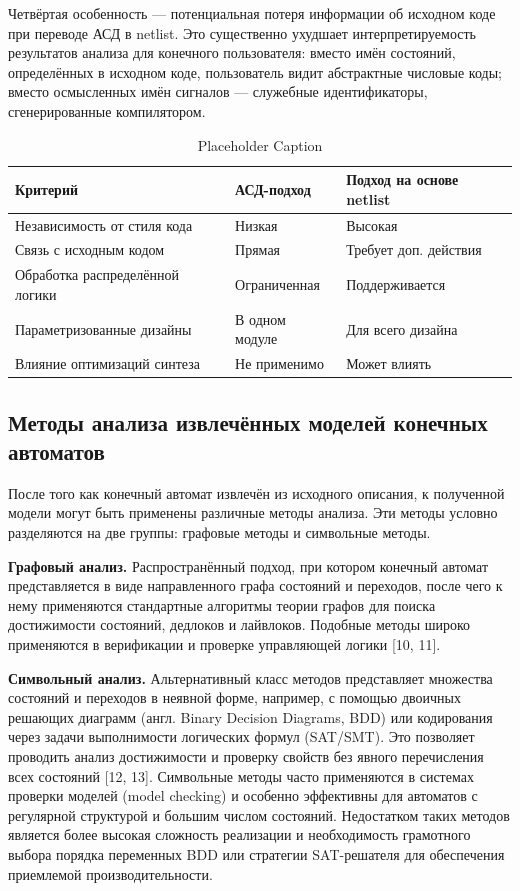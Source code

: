 Четвёртая особенность --- потенциальная потеря информации об исходном коде при переводе АСД
в netlist. Это существенно ухудшает интерпретируемость результатов анализа для конечного
пользователя: вместо имён состояний, определённых в исходном коде, пользователь видит абстрактные
числовые коды; вместо осмысленных имён сигналов — служебные идентификаторы,
сгенерированные компилятором.

\begin{table}[h]
    \centering
    \caption{Placeholder Caption}
    \label{tab:placeholder_label}
    \begin{tabular}{|l|l|l|}
        \hline
        \textbf{Критерий} & \textbf{АСД-подход} &
        \textbf{Подход на основе netlist} \\
        \hline
        Независимость от стиля кода & Низкая &
        Высокая \\
        \hline
        Связь с исходным кодом & Прямая & Требует доп. действия \\
        \hline
        Обработка распределённой логики & Ограниченная & Поддерживается \\
        \hline
        Параметризованные дизайны & В одном модуле & Для всего дизайна \\
        \hline
        Влияние оптимизаций синтеза & Не применимо & Может влиять \\
        \hline
    \end{tabular}
\end{table}

\subsection{Методы анализа извлечённых моделей конечных автоматов}

После того как конечный автомат извлечён из исходного описания, к полученной модели могут быть
применены различные методы анализа. Эти методы условно разделяются на две группы:
графовые методы и символьные методы.

\textbf{Графовый анализ.} Распространённый подход, при котором конечный автомат
представляется в виде направленного графа состояний и переходов, после чего к нему применяются
стандартные алгоритмы теории графов для поиска достижимости состояний, дедлоков и лайвлоков.
Подобные методы широко применяются в верификации и проверке управляющей логики [10, 11].

\textbf{Символьный анализ.} Альтернативный класс методов представляет множества состояний и
переходов в неявной форме, например, с помощью двоичных решающих диаграмм (англ. Binary Decision
Diagrams, BDD) или кодирования через задачи выполнимости логических формул (SAT/SMT). Это
позволяет проводить анализ достижимости и проверку свойств без явного перечисления всех
состояний [12, 13]. Символьные методы часто применяются в системах проверки моделей
(model checking) и особенно эффективны для автоматов с регулярной структурой и большим
числом состояний. Недостатком таких методов является более высокая сложность реализации
и необходимость грамотного выбора порядка переменных BDD или стратегии SAT-решателя
для обеспечения приемлемой производительности.

